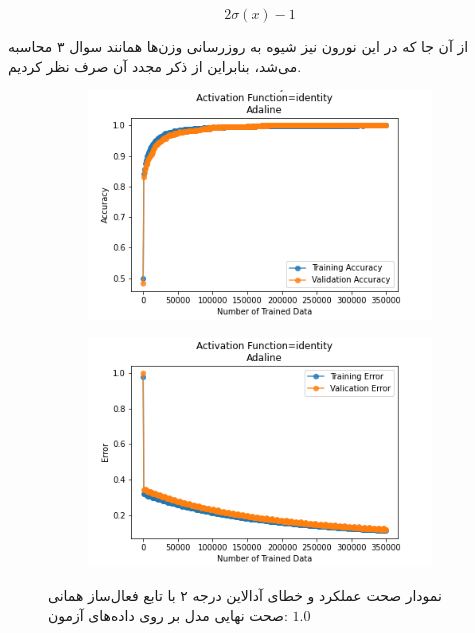 \documentclass[12pt, a4paper]{article}
\begin{document}
$$2\sigma(x) - 1$$

از آن جا که در این نورون نیز شیوه به روز‌رسانی وزن‌ها همانند سوال ۳ محاسبه می‌شد، بنابراین از
ذکر مجدد آن صرف نظر کردیم.

\vspace{1cm}

\begin{figure}[h]
    \begin{subfigure}{0.45\linewidth}
        \centering
        \includegraphics[width=\linewidth]{images/6/adaline/activation_func/identity_acc.png}
    \end{subfigure}
    \hfil
    \begin{subfigure}{0.45\linewidth}
        \centering
        \includegraphics[width=\linewidth]{images/6/adaline/activation_func/identity_error.png}
    \end{subfigure}
    \caption{نمودار صحت عملکرد‌ و خطای آدالاین درجه ۲ با تابع فعال‌ساز همانی
    \newline
    صحت نهایی مدل بر روی داده‌های آزمون: $1.0$}
\end{figure}
\end{document}
